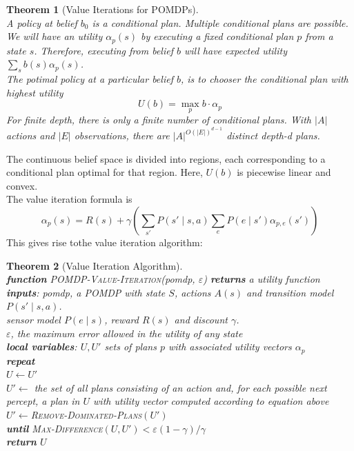 \documentclass[12pt]{article}
\newcommand{\ind}{\hspace*{15pt}}
\newtheorem{theorem}{Theorem}[section]
\theoremstyle{definition}
\begin{document}
\begin{theorem}[Value Iterations for POMDPs]
\hfill\\\normalfont A policy at belief $b_0$ is a conditional plan. Multiple conditional plans are possible. We will have an utility $\alpha_p(s)$ by executing a fixed conditional plan $p$ from a state $s$. Therefore, executing from belief $b$ will have expected utility $\sum_s b(s)\alpha_p(s)$.\\
The potimal policy at a particular belief $b$, is to chooser the conditional plan with highest utility
\[
U(b)=\max_p b\cdot \alpha_p
\]
For finite depth, there is only a finite number of conditional plans. With $|A|$ actions and $|E|$ observations, there are $|A|^{O(|E|)^{d-1}}$ distinct depth-d plans.
\end{theorem}
The continuous belief space is divided into regions, each corresponding to a conditional plan optimal for that region. Here, $U(b)$ is piecewise linear and convex.\\
The value iteration formula is
\[
\alpha_p(s)=R(s)+\gamma(\sum_{s'}P(s'\mid s,a)\sum_{e}P(e\mid s')\alpha_{p,e}(s'))
\]
This gives rise tothe value iteration algorithm:
\begin{theorem}[Value Iteration Algorithm]
\hfill\\\normalfont
\textbf{function} \textsc{POMDP-Value-Iteration}(\textit{pomdp}, $\varepsilon$) \textbf{returns} a utility function\\
\ind \textbf{inputs}: \textit{pomdp}, a POMDP with state $S$, actions $A(s)$ and transition model $P(s'\mid s,a)$.\\
\ind\ind\ind sensor model $P(e\mid s)$, reward $R(s)$ and discount $\gamma$.\\
\ind \ind\ind $\varepsilon$, the maximum error allowed in the utility of any state\\
\ind \textbf{local variables}: $U, U'$ sets of plans $p$ with associated utility vectors $\alpha_p$\\

\ind \textbf{repeat}\\
\ind \ind $U\leftarrow U'$\\
\ind \ind $U'\leftarrow$ the set of all plans consisting of an action and, for each possible next percept, a plan in $U$ with utility vector computed according to equation above\\
\ind \ind $U'\leftarrow$\textsc{Remove-Dominated-Plans}$(U')$\\
\ind \textbf{until} \textsc{Max-Difference}$(U,U')<\varepsilon(1-\gamma)/\gamma$\\
\ind \textbf{return} $U$\\
\end{theorem}
\end{document}
